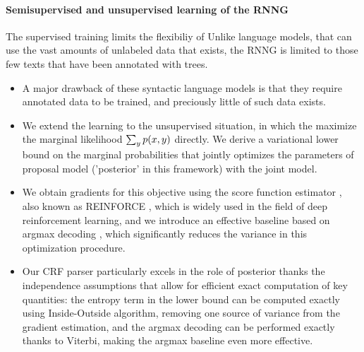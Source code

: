 \paragraph{Semisupervised and unsupervised learning of the RNNG}
  The supervised training limits the flexibiliy of Unlike language models, that can use the vast amounts of unlabeled data that exists, the RNNG is limited to those few texts that have been annotated with trees.
  \begin{itemize}

    \item A major drawback of these syntactic language models is that they require annotated data to be trained, and preciously little of such data exists.

    \item We extend the learning to the unsupervised situation, in which the maximize the marginal likelihood $\sum_y p( x, y)$ directly. We derive a variational lower bound on the marginal probabilities that jointly optimizes the parameters of proposal model ('posterior' in this framework) with the joint model.

    \item We obtain gradients for this objective using the score function estimator \citep{fu2006gradient}, also known as REINFORCE \citep{williams1992reinforce}, which is widely used in the field of deep reinforcement learning, and we introduce an effective baseline based on argmax decoding \citep{rennie2017argmax}, which significantly reduces the variance in this optimization procedure.

    \item Our CRF parser particularly excels in the role of posterior thanks the independence assumptions that allow for efficient exact computation of key quantities: the entropy term in the lower bound can be computed exactly using Inside-Outside algorithm, removing one source of variance from the gradient estimation, and the argmax decoding can be performed exactly thanks to Viterbi, making the argmax baseline even more effective.

  \end{itemize}

